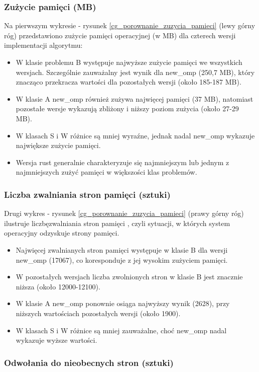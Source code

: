 \subsubsection{Zużycie pamięci (MB)}
Na pierwszym wykresie - rysunek \ref{cg_porownanie_zuzycia_pamieci} (lewy górny róg) przedstawiono zużycie pamięci operacyjnej (w MB) dla czterech wersji implementacji algorytmu:
\begin{itemize}
    \item W klasie problemu B występuje najwyższe zużycie pamięci we wszystkich wersjach. Szczególnie zauważalny jest wynik dla new\_omp (250,7 MB), który znacząco przekracza wartości dla pozostałych wersji (około 185-187 MB).
    \item W klasie A new\_omp również zużywa najwięcej pamięci (37 MB), natomiast pozostałe wersje wykazują zbliżony i niższy poziom zużycia (około 27-29 MB).
    \item W klasach S i W różnice są mniej wyraźne, jednak nadal new\_omp wykazuje największe zużycie pamięci.
    \item Wersja rust generalnie charakteryzuje się najmniejszym lub jednym z najmniejszych zużyć pamięci w większości klas problemów.
\end{itemize}

\subsubsection{Liczba zwalniania stron pamięci (sztuki)}
Drugi wykres - rysunek \ref{cg_porownanie_zuzycia_pamieci} (prawy górny róg) ilustruje liczbęzwalniania stron pamięci , czyli sytuacji, w których system operacyjny odzyskuje strony pamięci.
\begin{itemize}
    \item Najwięcej zwalnianych stron pamięci występuje w klasie B dla wersji new\_omp (17067), co koresponduje z jej wysokim zużyciem pamięci.
    \item W pozostałych wersjach liczba zwolnionych stron w klasie B jest znacznie niższa (około 12000-12100).
    \item W klasie A new\_omp ponownie osiąga najwyższy wynik (2628), przy niższych wartościach pozostałych wersji (około 1900).
    \item W klasach S i W różnice są mniej zauważalne, choć new\_omp nadal wykazuje wyższe wartości.
\end{itemize}

\subsubsection{Odwołania do nieobecnych stron (sztuki)}

